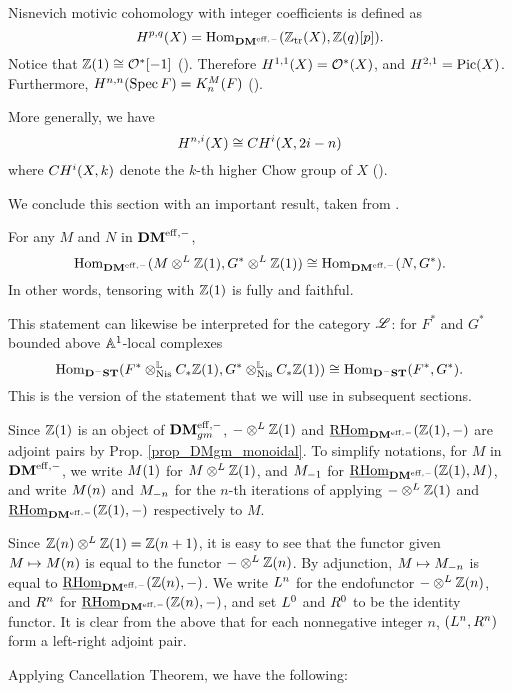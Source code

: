 \begin{rmk}\label{rmk_mot_coh}
Nisnevich motivic cohomology with integer coefficients is defined
as
\[
\MH^{p, q}(X) = \homDMf(\Ztr(X), \Z(q)[p]).
\]
Notice that $\Z(1) \cong \O^*[-1]$ (\cite[4.1]{MVW}).
Therefore $\MH^{1,1}(X) = \O^*(X)$, and $\MH^{2,1} = \Pic(X)$.
Furthermore, $\MH^{n,n}(\Spec F) = \milK_n(F)$ 
(\cite[5.1]{MVW}).

More generally, we have
\[
\MH^{n, i}(X) \cong \CH^i(X, 2i - n)
\]
where $\CH^i(X, k)$ denote the $k$-th higher Chow group of $X$
(\cite[19.1]{MVW}).
\end{rmk}

We conclude this section with an important result, taken from
\cite[4.10]{V02}.

\begin{thm}[Cancellation]\label{thm_dm_cancellation}
For any $M$ and $N$ in $\DMeff$,
\[
\homDMf(M \tDM \Z(1), G^* \tDM \Z(1)) \cong
   \homDMf(N, G^*).
\]
In other words, tensoring with $\Z(1)$ is fully and faithful.
\end{thm}

This statement can likewise be interpreted for the category 
$\ALocal$: for $F^*$ and $G^*$ bounded above $\A^1$-local 
complexes
\[
\hom_{\DShCor}(F^* \tLNis \suslC \Z(1), G^* \tLNis \suslC \Z(1))
\cong \hom_{\DShCor}(F^*, G^*).
\]
This is the version of the statement that we will use in
subsequent sections.

Since $\Z(1)$ is an object of $\DMeffgm$, $-\tDM \Z(1)$ and 
$\ihomDMf(\Z(1), -)$ are adjoint pairs by Prop. 
\ref{prop_DMgm_monoidal}. To simplify notations, for $M$ in 
$\DMeff$, we write $\tZ{M}$ for $M \tDM \Z(1)$, and $\hZ{M}$ for 
$\ihomDMf(\Z(1), M)$, and write $\tZ[n]{M}$ and 
$\hZ[n]{M}$ for the $n$-th iterations of applying $- \tDM \Z(1)$ 
and $\ihomDMf(\Z(1), -)$ respectively to $M$. 

Since $\Z(n) \tDM \Z(1) = \Z(n + 1)$, it is easy to see that the 
functor given $M \mapsto \tZ[n]{M}$ is equal to the functor $- 
\tDM \Z(n)$. By adjunction, $M \mapsto \hZ[n]{M}$ is equal to 
$\ihomDMf(\Z(n), -)$. We write $\LDMf{n}$ for the endofunctor $- 
\tDM \Z(n)$, and $\RDMf{n}$ for $\ihomDMf(\Z(n), -)$, and set 
$\LDMf{0}$ and $\RDMf{0}$ to be the identity functor. It is clear 
from the above that for each nonnegative integer $n$, $(\LDMf{n}, 
\RDMf{n})$ form a left-right adjoint pair.

Applying Cancellation Theorem, we have the following:

